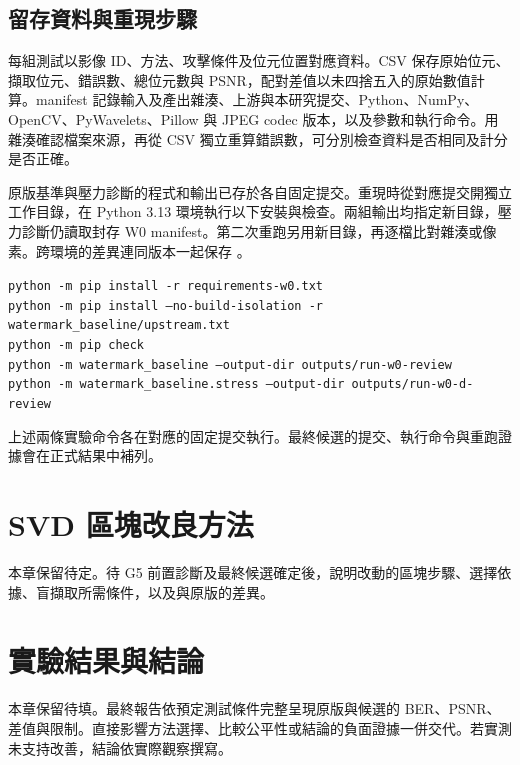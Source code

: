 \documentclass[12pt,a4paper,onecolumn]{article}
\begin{document}
\subsection{留存資料與重現步驟}
每組測試以影像 ID、方法、攻擊條件及位元位置對應資料。CSV 保存原始位元、擷取位元、錯誤數、總位元數與 PSNR，配對差值以未四捨五入的原始數值計算。manifest 記錄輸入及產出雜湊、上游與本研究提交、Python、NumPy、OpenCV、PyWavelets、Pillow 與 JPEG codec 版本，以及參數和執行命令。用雜湊確認檔案來源，再從 CSV 獨立重算錯誤數，可分別檢查資料是否相同及計分是否正確。

原版基準與壓力診斷的程式和輸出已存於各自固定提交。重現時從對應提交開獨立工作目錄，在 Python 3.13 環境執行以下安裝與檢查。兩組輸出均指定新目錄，壓力診斷仍讀取封存 W0 manifest。第二次重跑另用新目錄，再逐檔比對雜湊或像素。跨環境的差異連同版本一起保存 \cite{w0pr,w0d}。

\begin{flushleft}
\texttt{python -m pip install -r requirements-w0.txt}\\
\texttt{python -m pip install --no-build-isolation -r watermark\_baseline/upstream.txt}\\
\texttt{python -m pip check}\\
\texttt{python -m watermark\_baseline --output-dir outputs/run-w0-review}\\
\texttt{python -m watermark\_baseline.stress --output-dir outputs/run-w0-d-review}
\end{flushleft}

上述兩條實驗命令各在對應的固定提交執行。最終候選的提交、執行命令與重跑證據會在正式結果中補列。

\section{SVD 區塊改良方法}
本章保留待定。待 G5 前置診斷及最終候選確定後，說明改動的區塊步驟、選擇依據、盲擷取所需條件，以及與原版的差異。

\section{實驗結果與結論}
本章保留待填。最終報告依預定測試條件完整呈現原版與候選的 BER、PSNR、差值與限制。直接影響方法選擇、比較公平性或結論的負面證據一併交代。若實測未支持改善，結論依實際觀察撰寫。
\end{document}
